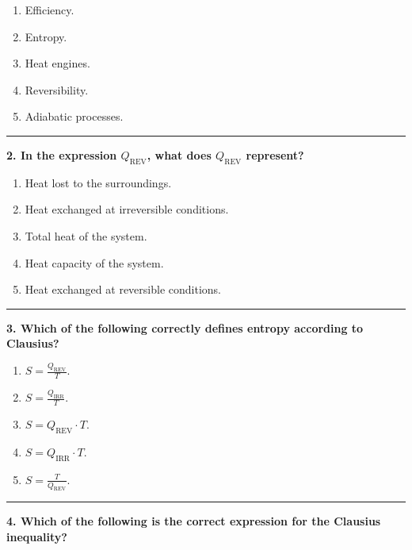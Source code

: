 \documentclass[
  9pt,
]{extbook}
\providecommand{\tightlist}{%
  \setlength{\itemsep}{0pt}\setlength{\parskip}{0pt}}
\theoremstyle{definition}
\theoremstyle{definition}
\theoremstyle{definition}
\theoremstyle{definition}
\theoremstyle{remark}
\begin{document}
\begin{enumerate}
\def\labelenumi{\alph{enumi}.}
\tightlist
\item
  Efficiency.
\item
  Entropy.
\item
  Heat engines.
\item
  Reversibility.
\item
  Adiabatic processes.
\end{enumerate}

\begin{center}\rule{0.5\linewidth}{0.5pt}\end{center}

\textbf{2. In the expression \(Q_{\text{REV}}\), what does \(Q_{\text{REV}}\) represent?}

\begin{enumerate}
\def\labelenumi{\alph{enumi}.}
\tightlist
\item
  Heat lost to the surroundings.
\item
  Heat exchanged at irreversible conditions.
\item
  Total heat of the system.
\item
  Heat capacity of the system.
\item
  Heat exchanged at reversible conditions.
\end{enumerate}

\begin{center}\rule{0.5\linewidth}{0.5pt}\end{center}

\textbf{3. Which of the following correctly defines entropy according to Clausius?}

\begin{enumerate}
\def\labelenumi{\alph{enumi}.}
\tightlist
\item
  \(S = \frac{Q_{\text{REV}}}{T}\).
\item
  \(S = \frac{Q_{\text{IRR}}}{T}\).
\item
  \(S = Q_{\text{REV}} \cdot T\).
\item
  \(S = Q_{\text{IRR}} \cdot T\).
\item
  \(S = \frac{T}{Q_{\text{REV}}}\).
\end{enumerate}

\begin{center}\rule{0.5\linewidth}{0.5pt}\end{center}

\textbf{4. Which of the following is the correct expression for the Clausius inequality?}
\end{document}

